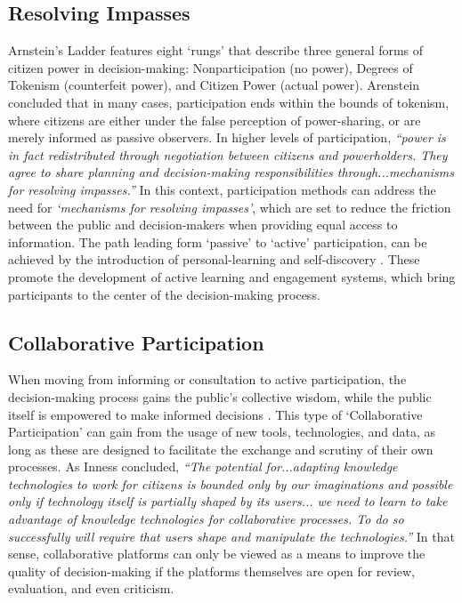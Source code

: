 {{      \subsection{Resolving Impasses}
      {
          Arnstein's Ladder features eight `rungs' that describe three general forms of citizen power in decision-making: Nonparticipation (no power), Degrees of Tokenism (counterfeit power), and Citizen Power (actual power). Arenstein concluded that in many cases, participation ends within the bounds of tokenism, where citizens are either under the false perception of power-sharing, or are merely informed as passive observers. In higher levels of participation, \textit{``power is in fact redistributed through negotiation between citizens and powerholders. They agree to share planning and decision-making responsibilities through...mechanisms for resolving impasses.''} \cite{arnstein1969ladder}
          In this context, participation methods can address the need for \textit{`mechanisms for resolving impasses'}, which are set to reduce the friction between the public and decision-makers when providing equal access to information. The path leading form `passive' to `active' participation, can be achieved by the introduction of personal-learning and self-discovery \cite{bulmer_how_2001}. These promote the development of active learning and engagement systems, which bring participants to the center of the decision-making process.
      }

      \subsection{Collaborative Participation}
      {
          When moving from informing or consultation to active participation, the decision-making process gains the public's collective wisdom, while the public itself is empowered to make informed decisions \cite{innes2010planning}. This type of `Collaborative Participation' can gain from the usage of new tools, technologies, and data, as long as these are designed to facilitate the exchange and scrutiny of their own processes. As Inness concluded, \textit{``The potential for...adapting knowledge technologies to work for citizens is bounded only by our imaginations and possible only if technology itself is partially shaped by its users... we need to learn to take advantage of knowledge technologies for collaborative processes. To do so successfully will require that users shape and manipulate the technologies.''}\cite{innes2010planning} In that sense, collaborative platforms can only be viewed as a means to improve the quality of decision-making if the platforms themselves are open for review, evaluation, and even criticism.
      }
     }


}
